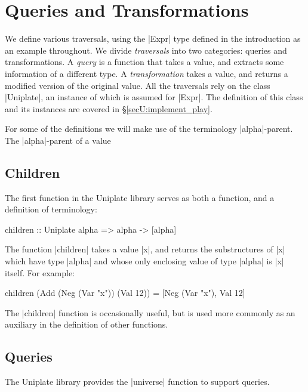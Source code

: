 \section{Queries and Transformations}
\label{secU:use_play}

We define various traversals, using the |Expr| type defined in the introduction as an example throughout. We divide \textit{traversals} into two categories: queries and transformations. A \textit{query} is a function that takes a value, and extracts some information of a different type. A \textit{transformation} takes a value, and returns a modified version of the original value. All the traversals rely on the class |Uniplate|, an instance of which is assumed for |Expr|. The definition of this class and its instances are covered in \S\ref{secU:implement_play}.

For some of the definitions we will make use of the terminology |alpha|-parent. The |alpha|-parent of a value 

\subsection{Children}

The first function in the Uniplate library serves as both a function, and a definition of terminology:

\begin{code}
children :: Uniplate alpha => alpha -> [alpha]
\end{code}


The function |children| takes a value |x|, and returns the substructures of |x| which have type |alpha| and whose only enclosing value of type |alpha| is |x| itself. For example:

\begin{code}
children (Add (Neg (Var "x")) (Val 12)) = [Neg (Var "x"), Val 12]
\end{code}

The |children| function is occasionally useful, but is used more commonly as an auxiliary in the definition of other functions.


\subsection{Queries}

The Uniplate library provides the |universe| function to support queries.

